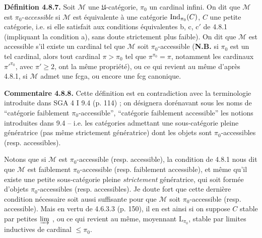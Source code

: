 \textbf{Définition 4.8.7.} Soit $\mathcal{M}$ une $\mathfrak{U}$-catégorie, $\pi_0$ un cardinal infini. On dit que $\mathcal{M}$ est $\pi_0$-\textit{accessible} si $\mathcal{M}$ est équivalente à une catégorie $\operatorname{Ind}_{\pi_0}(C)$, $C$ une petite catégorie, i.e. si elle satisfait aux conditions équivalentes b, c, c$'$ de 4.8.1 (impliquant la condition a), sans doute strictement plus faible). On dit que $\mathcal{M}$ est accessible s'il existe un cardinal tel que $\mathcal{M}$ soit $\pi_0$-accessible (\textbf{N.B.} si $\pi_0$ est un tel cardinal, alors tout cardinal $\pi>\pi_0$ tel que $\pi^{\pi_0}=\pi$, notamment les cardinaux $\pi'^{\pi_0}$, avec $\pi'\geqslant 2$, ont la même propriété), ou ce
qui revient au même d'après 4.8.1, si $\mathcal{M}$ admet une fcga, ou encore une fcg canonique.

\textbf{Commentaire 4.8.8.} Cette définition est en contradiction avec la terminologie introduite dans SGA 4 I 9.4 (p. 114) ; on désignera dorénavant sous les noms de ``catégorie faiblement $\pi_0$-accessible'', ``catégorie faiblement accessible'' les notions introduites dans 9.4 -- i.e. les catégories admettant une sous-catégorie pleine génératrice (pas même strictement génératrice) dont les objets sont $\pi_0$-accessibles (resp. accessibles).

Notons que si $\mathcal{M}$ est $\pi_0$-accessible (resp. accessible), la condition de 4.8.1 nous dit que $\mathcal{M}$ est faiblement $\pi_0$-accessible (resp. faiblement accessible), et même qu'il existe une petite sous-catégorie pleine \textit{strictement} génératrice, qui soit formée d'objets $\pi_0$-accessibles (resp. accessibles). Je doute fort que cette dernière condition nécessaire soit aussi suffisante pour
que $\mathcal{M}$ soit $\pi_0$-accessible (resp. accessible). Mais en vertu de 4.6.3.3 (p. 150), il en est ainsi si on suppose $C$ stable par petites $\varinjlim$ , ou ce qui revient au même, moyennant $\mathrm{L}_{\pi_0}$, stable par limites inductives de cardinal $\leqslant\pi_0$.


